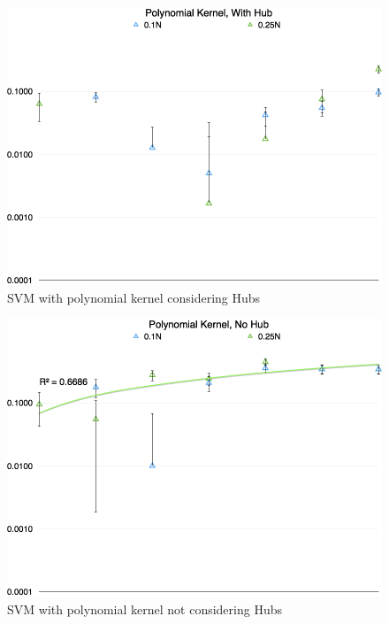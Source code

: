 \documentclass{sig-alternate-10pt}
\begin{document}
\begin{figure}
\begin{center}
\includegraphics[width=\columnwidth]{img/poly_hub}
\caption{SVM with polynomial kernel considering Hubs}
\label{poly_hub}
\end{center}
\end{figure}

\begin{figure}
\begin{center}
\includegraphics[width=\columnwidth]{img/poly_no_hub}
\caption{SVM with polynomial kernel not considering Hubs}
\label{poly_no_hub}
\end{center}
\end{figure}
\end{document}
